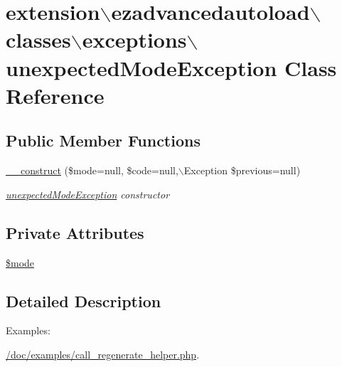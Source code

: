 \hypertarget{classextension_1_1ezadvancedautoload_1_1classes_1_1exceptions_1_1unexpected_mode_exception}{\section{extension$\backslash$ezadvancedautoload$\backslash$classes$\backslash$exceptions$\backslash$unexpected\-Mode\-Exception Class Reference}
\label{classextension_1_1ezadvancedautoload_1_1classes_1_1exceptions_1_1unexpected_mode_exception}
}
\subsection*{Public Member Functions}
\begin{DoxyCompactItemize}
\item 
\hyperlink{classextension_1_1ezadvancedautoload_1_1classes_1_1exceptions_1_1unexpected_mode_exception_a487408899c0e62f331bc4942200fbaa3}{\-\_\-\-\_\-construct} (\$mode=null, \$code=null,$\backslash$Exception \$previous=null)
\begin{DoxyCompactList}\small\item\em \hyperlink{classextension_1_1ezadvancedautoload_1_1classes_1_1exceptions_1_1unexpected_mode_exception}{unexpected\-Mode\-Exception} constructor \end{DoxyCompactList}\end{DoxyCompactItemize}
\subsection*{Private Attributes}
\begin{DoxyCompactItemize}
\item 
\hyperlink{classextension_1_1ezadvancedautoload_1_1classes_1_1exceptions_1_1unexpected_mode_exception_a884548141df89038db6e6fca2765f2bc}{\$mode}
\end{DoxyCompactItemize}


\subsection{Detailed Description}
\begin{Desc}
\item[Examples\-: ]\par
\hyperlink{_2doc_2examples_2call_regenerate_helper_8php-example}{/doc/examples/call\-\_\-regenerate\-\_\-helper.\-php}.\end{Desc}


